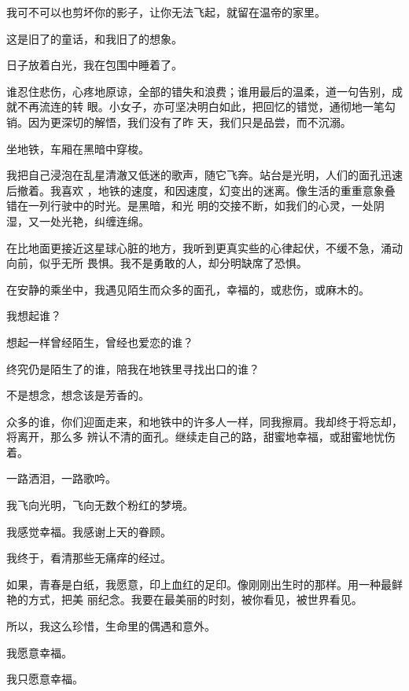 \documentclass[12pt,a4paper]{article}
\begin{document}
		我可不可以也剪坏你的影子，让你无法飞起，就留在温帝的家里。

		这是旧了的童话，和我旧了的想象。

		日子放着白光，我在包围中睡着了。

	\endwriting



		谁忍住悲伤，心疼地原谅，全部的错失和浪费；谁用最后的温柔，道一句告别，成就不再流连的转
	眼。小女子，亦可坚决明白如此，把回忆的错觉，通彻地一笔勾销。因为更深切的解悟，我们没有了昨
	天，我们只是品尝，而不沉溺。

		坐地铁，车厢在黑暗中穿梭。

		我把自己浸泡在乱星清澈又低迷的歌声，随它飞奔。站台是光明，人们的面孔迅速后撤着。我喜欢
	，地铁的速度，和因速度，幻变出的迷离。像生活的重重意象叠错在一列行驶中的时光。是黑暗，和光
	明的交接不断，如我们的心灵，一处阴湿，又一处光艳，纠缠连绵。

		在比地面更接近这星球心脏的地方，我听到更真实些的心律起伏，不缓不急，涌动向前，似乎无所
	畏惧。我不是勇敢的人，却分明缺席了恐惧。

		在安静的乘坐中，我遇见陌生而众多的面孔，幸福的，或悲伤，或麻木的。

		我想起谁？\par
		想起一样曾经陌生，曾经也爱恋的谁？\par
		终究仍是陌生了的谁，陪我在地铁里寻找出口的谁？\par
		不是想念，想念该是芳香的。

		众多的谁，你们迎面走来，和地铁中的许多人一样，同我擦肩。我却终于将忘却，将离开，那么多
	辨认不清的面孔。继续走自己的路，甜蜜地幸福，或甜蜜地忧伤着。

		一路洒泪，一路歌吟。\par
		我飞向光明，飞向无数个粉红的梦境。\par
		我感觉幸福。我感谢上天的眷顾。\par
		我终于，看清那些无痛痒的经过。

		如果，青春是白纸，我愿意，印上血红的足印。像刚刚出生时的那样。用一种最鲜艳的方式，把美
	丽纪念。我要在最美丽的时刻，被你看见，被世界看见。

		所以，我这么珍惜，生命里的偶遇和意外。

		我愿意幸福。

		我只愿意幸福。

	\endwriting


\end{document}
